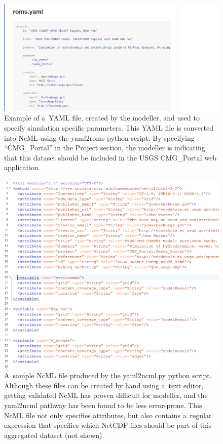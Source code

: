 \documentclass[osd, online, hvmath]{copernicus}
\begin{document}
\begin{figure}
\includegraphics[width=140mm]{os-2015-64-discussions-f07.png}
\caption{Example of a~YAML file, created by the modeller, and used to
  specify simulation specific parameters. This YAML file is converted
  into NcML using the yaml2roms python script. By specifying
  ``CMG\_Portal'' in the Project section, the modeller is indicating
  that this dataset should be included in the USGS CMG\_Portal web
  application.}
\label{osd-2015-0064-f07.pdf}
\end{figure}

\begin{figure}
\includegraphics[width=130mm]{os-2015-64-discussions-f08.png}
\caption{A~sample NcML file produced by the yaml2ncml.py python
  script.  Although these files can be created by hand using a~text
  editor, getting validated NcML has proven difficult for modeller,
  and the yaml2ncml pathway has been found to be less
  error-prone. This NcML file not only specifies attributes, but also
  contains a~regular expression that specifies which NetCDF files
  should be part of this aggregated dataset (not shown).}
\label{osd-2015-0064-f08.pdf}
\end{figure}
\end{document}

